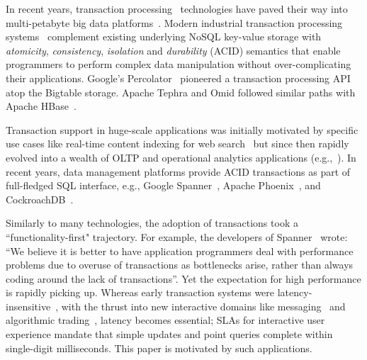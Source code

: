 In recent years, transaction processing~\cite{Gray:1992:TPC:573304} technologies have paved their way into multi-petabyte big data 
platforms~\cite{Percolator2010,Spanner2012,Omid2017}. 
Modern industrial transaction processing systems~\cite{Percolator2010, Omid2017, tephra, cockroach} complement 
existing underlying NoSQL key-value storage with {\em atomicity}, {\em consistency}, {\em isolation\/} and {\em durability} (ACID) 
semantics that enable programmers to perform complex data manipulation without over-complicating their applications. 
Google's Percolator~\cite{Percolator2010} pioneered a transaction processing API atop the Bigtable storage. Apache 
Tephra and Omid followed similar paths with Apache HBase~\cite{hbase}. 

Transaction support in huge-scale applications was initially motivated by specific use cases like real-time content indexing for 
web search~\cite{Percolator2010, Omid2017} but since then rapidly evolved into a wealth of OLTP and operational analytics 
applications (e.g.,~\cite{Borthakur:2011, F1-2013}). In recent years, data management platforms provide ACID transactions as part of full-fledged 
SQL interface, e.g., Google Spanner~\cite{Spanner2012}, Apache Phoenix~\cite{phoenix}, and CockroachDB~\cite{cockroach}. 

Similarly to many technologies, the adoption of transactions took a  ``functionality-first" trajectory. 
For example, the developers of Spanner~\cite{Spanner2012} wrote: ``We believe it
is better to have application programmers deal with performance problems due to overuse 
of transactions as bottlenecks arise, rather than always coding around the lack of transactions''. 
Yet the expectation for high performance is rapidly picking up. 
Whereas early transaction systems were  latency-insensitive~\cite{Percolator2010, Omid2017}, 
with the thrust into new interactive domains like messaging~\cite{Borthakur:2011} and algorithmic 
trading~\cite{opentsdb}, latency becomes essential;   SLAs for interactive user experience
mandate that simple updates and point queries  complete within single-digit milliseconds. 
This paper is motivated by such  applications.

